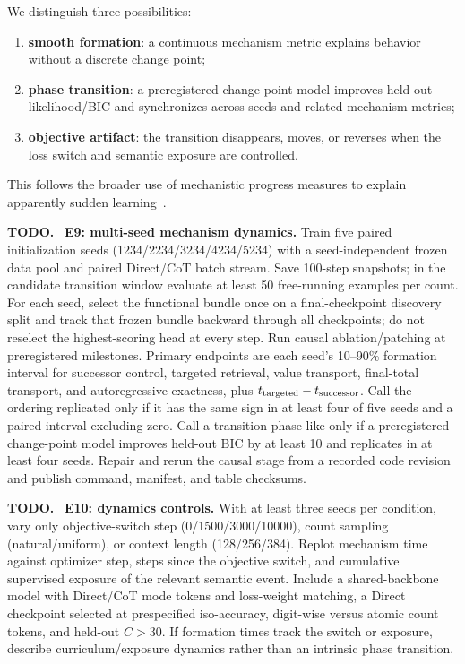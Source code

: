 \documentclass[11pt]{article}
\newenvironment{todobox}
  {\begin{center}\begin{minipage}{0.95\linewidth}\color{todored}\textbf{TODO.}~}
  {\end{minipage}\end{center}}
\begin{document}
We distinguish three possibilities:
\begin{enumerate}
  \item \textbf{smooth formation}: a continuous mechanism metric explains behavior without a discrete change point;
  \item \textbf{phase transition}: a preregistered change-point model improves held-out likelihood/BIC and synchronizes across seeds and related mechanism metrics;
  \item \textbf{objective artifact}: the transition disappears, moves, or reverses when the loss switch and semantic exposure are controlled.
\end{enumerate}
This follows the broader use of mechanistic progress measures to explain apparently sudden learning~\citep{nanda2023grokking,olsson2022induction}.

\begin{todobox}
\textbf{E9: multi-seed mechanism dynamics.} Train five paired initialization seeds (1234/2234/3234/4234/5234) with a seed-independent frozen data pool and paired Direct/CoT batch stream. Save 100-step snapshots; in the candidate transition window evaluate at least 50 free-running examples per count. For each seed, select the functional bundle once on a final-checkpoint discovery split and track that frozen bundle backward through all checkpoints; do not reselect the highest-scoring head at every step. Run causal ablation/patching at preregistered milestones. Primary endpoints are each seed's 10--90\% formation interval for successor control, targeted retrieval, value transport, final-total transport, and autoregressive exactness, plus $t_{\rm targeted}-t_{\rm successor}$. Call the ordering replicated only if it has the same sign in at least four of five seeds and a paired interval excluding zero. Call a transition phase-like only if a preregistered change-point model improves held-out BIC by at least 10 and replicates in at least four seeds. Repair and rerun the causal stage from a recorded code revision and publish command, manifest, and table checksums.
\end{todobox}

\begin{todobox}
\textbf{E10: dynamics controls.} With at least three seeds per condition, vary only objective-switch step (0/1500/3000/10000), count sampling (natural/uniform), or context length (128/256/384). Replot mechanism time against optimizer step, steps since the objective switch, and cumulative supervised exposure of the relevant semantic event. Include a shared-backbone model with Direct/CoT mode tokens and loss-weight matching, a Direct checkpoint selected at prespecified iso-accuracy, digit-wise versus atomic count tokens, and held-out $C>30$. If formation times track the switch or exposure, describe curriculum/exposure dynamics rather than an intrinsic phase transition.
\end{todobox}
\end{document}

